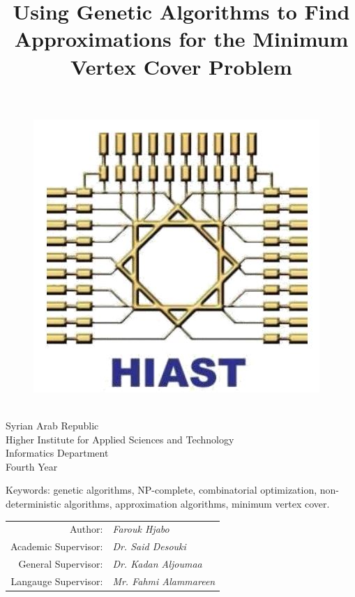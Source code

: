 \documentclass[12pt]{article}
\title{Using Genetic Algorithms to Find Approximations for the Minimum Vertex Cover Problem}
\author{}
\date{}
\newcommand{\lineSeparationLength}{2mm}
\begin{document}
\cleardoublepage{}

{
\begin{figure}
\hfill
\includegraphics[width=0.9\linewidth]{hiast}
\end{figure}

\ \\[\lineSeparationLength]
Syrian Arab Republic \\[\lineSeparationLength]
Higher Institute for Applied Sciences and Technology \\[\lineSeparationLength]
Informatics Department \\[\lineSeparationLength]
Fourth Year
}

\vspace{25mm}
{\let\newpage\relax\maketitle}

\vspace{-10mm}
\begin{center}
Keywords: genetic algorithms, NP-complete, combinatorial optimization, non-deterministic algorithms, approximation algorithms, minimum vertex cover.
\end{center}

\vspace{5mm}
\begin{center}
\begin{onehalfspacing}

\begin{tabular}{r l}
Author:					&	\textit{Farouk Hjabo} \\
Academic Supervisor:	&	\textit{Dr. Said Desouki} \\
General Supervisor:		&	\textit{Dr. Kadan Aljoumaa} \\
Langauge Supervisor:	&	\textit{Mr. Fahmi Alammareen} \\
\end{tabular}

\end{onehalfspacing}
\end{center}
\end{document}
